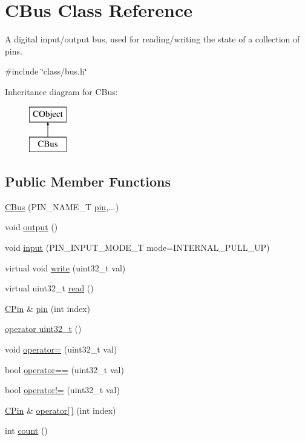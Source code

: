 \hypertarget{class_c_bus}{\section{C\-Bus Class Reference}
\label{class_c_bus}
}


A digital input/output bus, used for reading/writing the state of a collection of pins.  




{\ttfamily \#include \char`\"{}class/bus.\-h\char`\"{}}

Inheritance diagram for C\-Bus\-:\begin{figure}[H]
\begin{center}
\leavevmode
\includegraphics[height=2.000000cm]{class_c_bus}
\end{center}
\end{figure}
\subsection*{Public Member Functions}
\begin{DoxyCompactItemize}
\item 
\hyperlink{class_c_bus_a5f859ac1582a6cbe9b5b420c6c051e63}{C\-Bus} (P\-I\-N\-\_\-\-N\-A\-M\-E\-\_\-\-T \hyperlink{class_c_bus_a94da38619defc1c41c16c04c4c7991f8}{pin},...)
\item 
void \hyperlink{class_c_bus_a5f797dca77eb5a86048c65e567a2d233}{output} ()
\item 
void \hyperlink{class_c_bus_ad45a06493f12aef3d096ac3ed86a3b8f}{input} (P\-I\-N\-\_\-\-I\-N\-P\-U\-T\-\_\-\-M\-O\-D\-E\-\_\-\-T mode=I\-N\-T\-E\-R\-N\-A\-L\-\_\-\-P\-U\-L\-L\-\_\-\-U\-P)
\item 
virtual void \hyperlink{class_c_bus_a4852669ff7ae53e68cf125aa49a87bd0}{write} (uint32\-\_\-t val)
\item 
virtual uint32\-\_\-t \hyperlink{class_c_bus_ae5c9d649c6f6b22a93fb29e0152a57c1}{read} ()
\item 
\hyperlink{class_c_pin}{C\-Pin} \& \hyperlink{class_c_bus_a94da38619defc1c41c16c04c4c7991f8}{pin} (int index)
\item 
\hyperlink{class_c_bus_add3835bd7327b63bdaa480938d5a8adc}{operator uint32\-\_\-t} ()
\item 
void \hyperlink{class_c_bus_a9f639b395906de4549c51deb0a0ad79c}{operator=} (uint32\-\_\-t val)
\item 
bool \hyperlink{class_c_bus_a55d1c493025b37e0f34801b8ced31068}{operator==} (uint32\-\_\-t val)
\item 
bool \hyperlink{class_c_bus_a3ea59ccbb16b92e2763a00b3baa10fd6}{operator!=} (uint32\-\_\-t val)
\item 
\hyperlink{class_c_pin}{C\-Pin} \& \hyperlink{class_c_bus_a12e4d076164971de589cbc5b2f6537e2}{operator\mbox{[}$\,$\mbox{]}} (int index)
\item 
int \hyperlink{class_c_bus_a4fa0e4c537c237278fe8092f4d8e26fb}{count} ()
\end{DoxyCompactItemize}


